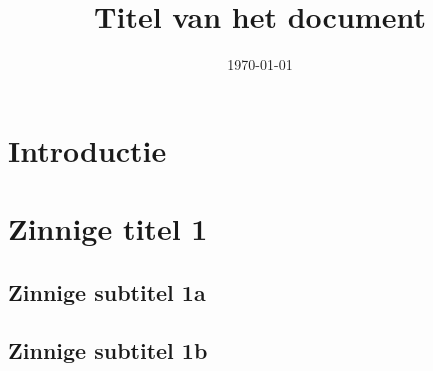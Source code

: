 \documentclass[12pt]{uva-inf-article}
\title{Titel van het document}
\date{\today}
\begin{document}
\maketitle



\section{Introductie}
\lipsum[21]



\section{Zinnige titel 1}
\lipsum[22]
\subsection{Zinnige subtitel 1a}
\lipsum[23]
\subsection{Zinnige subtitel 1b}
\lipsum[24]

\end{document}
